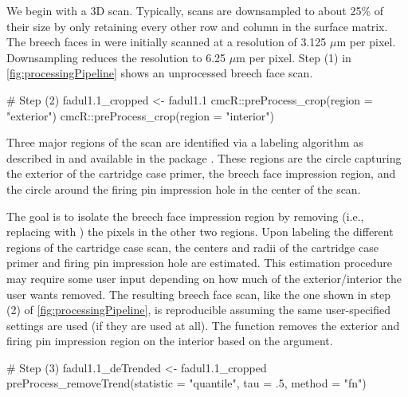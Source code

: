 We begin with a 3D scan. Typically, scans are downsampled to about 25\%
of their size by only retaining every other row and column in the
surface matrix. The breech faces in \citet{fadul_empirical_2011} were
initially scanned at a resolution of 3.125 \(\mu\)m per pixel.
Downsampling reduces the resolution to 6.25 \(\mu\)m per pixel. Step (1)
in \autoref{fig:processingPipeline} shows an unprocessed breech face
scan.

\begin{Schunk}
\begin{Sinput}
# Step (2)
fadul1.1_cropped <- fadul1.1 %
  cmcR::preProcess_crop(region = "exterior") %
  cmcR::preProcess_crop(region = "interior")
\end{Sinput}
\end{Schunk}

Three major regions of the scan are identified via a labeling algorithm
as described in \citet{hesselink_concurrent_2001} and available in the
 package \citep{imager}. These regions are the circle
capturing the exterior of the cartridge case primer, the breech face
impression region, and the circle around the firing pin impression hole
in the center of the scan.

The goal is to isolate the breech face impression region by removing
(i.e., replacing with ) the pixels in the other two regions.
Upon labeling the different regions of the cartridge case scan, the
centers and radii of the cartridge case primer and firing pin impression
hole are estimated. This estimation procedure may require some user
input depending on how much of the exterior/interior the user wants
removed. The resulting breech face scan, like the one shown in step (2)
of \autoref{fig:processingPipeline}, is reproducible assuming the same
user-specified settings are used (if they are used at all). The
 function removes the exterior and firing pin
impression region on the interior based on the  argument.

\begin{Schunk}
\begin{Sinput}
# Step (3)
fadul1.1_deTrended <- fadul1.1_cropped %
  preProcess_removeTrend(statistic = "quantile", tau = .5, method = "fn")
\end{Sinput}
\end{Schunk}


